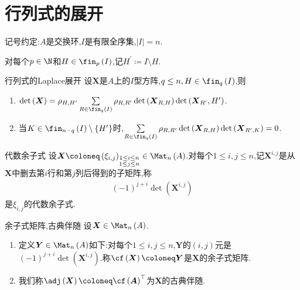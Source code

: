 \section{行列式的展开}

记号约定:$A$是交换环,$I$是有限全序集,$\left|I\right|=n$.

\begin{definition}{}{}
	对每个$p\in\N$和$H\in\fin_{p}\left(I\right)$,记$H^{\prime}\coloneq I\setminus H$.
\end{definition}

\begin{proposition}{行列式的Laplace展开}{}
	设$\boldsymbol{X}$是$A$上的$I$型方阵,$q\leq n,H\in\fin_{q}\left(I\right)$,则
	\begin{enumerate}
		\item $\det\left(\boldsymbol{X}\right)=\rho_{H,H^{\prime}}\sum\limits_{R\in\fin_{q}\left(I\right)}\rho_{R,R^{\prime}}\det\left(\boldsymbol{X}_{R,H}\right)\det\left(\boldsymbol{X}_{R^{\prime}},H^{\prime}\right)$.
		\item 当$K\in\fin_{n-q}\left(I\right)\setminus\left\{H^{\prime}\right\}$时,$\sum\limits_{R\in\fin_{q}\left(I\right)}\rho_{R,R^{\prime}}\det\left(\boldsymbol{X}_{R,H}\right)\det\left(\boldsymbol{X}_{R^{\prime},K}\right)=0$.
	\end{enumerate}
\end{proposition}

\begin{definition}{代数余子式}{}
	设$\boldsymbol{X}\coloneq\left(\xi_{i,j}\right)_{\substack{1\leq i\leq n\\1\leq j\leq n}}\in\Mat_{n}\left(A\right)$.对每个$1\leq i,j\leq n$,记$\boldsymbol{X}^{i,j}$是从$\boldsymbol{X}$中删去第$i$行和第$j$列后得到的子矩阵,称
	\begin{align*}
		\left(-1\right)^{j+i}\det\left(\boldsymbol{X}^{i,j}\right)
	\end{align*}
	是$\xi_{i,j}$的代数余子式.
\end{definition}

\begin{definition}{余子式矩阵,古典伴随}{}
	设$\boldsymbol{X}\in\Mat_{n}\left(A\right)$.
	\begin{enumerate}
		\item 定义$\boldsymbol{Y}\in\Mat_{n}\left(A\right)$如下:对每个$1\leq i,j\leq n$,$\boldsymbol{Y}$的$\left(i,j\right)$元是$\left(-1\right)^{j+i}\det\left(\boldsymbol{X}^{i,j}\right)$.称$\cf\left(\boldsymbol{X}\right)\coloneq\boldsymbol{Y}$是$\boldsymbol{X}$的余子式矩阵.
		\item 我们称$\adj\left(\boldsymbol{X}\right)\coloneq\cf\left(\boldsymbol{A}\right)^{\top}$为$\boldsymbol{X}$的古典伴随.
	\end{enumerate}
\end{definition}

